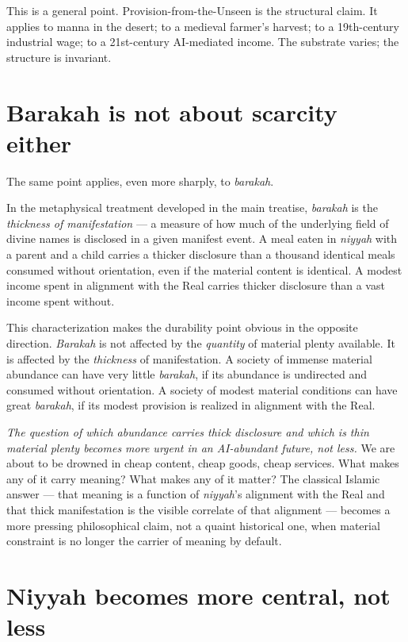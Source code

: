 \documentclass[11pt,a4paper]{article}
\newcommand{\arb}[1]{\textit{#1}}
\begin{document}
This is a general point. Provision-from-the-Unseen is the
structural claim. It applies to manna in the desert; to a
medieval farmer's harvest; to a 19th-century industrial wage; to
a 21st-century AI-mediated income. The substrate varies; the
structure is invariant.

\section{Barakah is not about scarcity either}
\label{sec:barakah-not-scarcity}

The same point applies, even more sharply, to \arb{barakah}.

In the metaphysical treatment developed in the main treatise,
\arb{barakah} is the \textit{thickness of manifestation} --- a
measure of how much of the underlying field of divine names is
disclosed in a given manifest event. A meal eaten in \arb{niyyah}
with a parent and a child carries a thicker disclosure than a
thousand identical meals consumed without orientation, even if the
material content is identical. A modest income spent in alignment
with the Real carries thicker disclosure than a vast income spent
without.

This characterization makes the durability point obvious in the
opposite direction. \arb{Barakah} is not affected by the
\textit{quantity} of material plenty available. It is affected by
the \textit{thickness} of manifestation. A society of immense
material abundance can have very little \arb{barakah}, if its
abundance is undirected and consumed without orientation. A
society of modest material conditions can have great \arb{barakah},
if its modest provision is realized in alignment with the Real.

\textit{The question of which abundance carries thick disclosure
and which is thin material plenty becomes more urgent in an
AI-abundant future, not less.} We are about to be drowned in cheap
content, cheap goods, cheap services. What makes any of it carry
meaning? What makes any of it matter? The classical Islamic
answer --- that meaning is a function of \arb{niyyah}'s alignment
with the Real and that thick manifestation is the visible
correlate of that alignment --- becomes a more pressing
philosophical claim, not a quaint historical one, when material
constraint is no longer the carrier of meaning by default.

\section{Niyyah becomes more central, not less}
\label{sec:niyyah-central}
\end{document}
